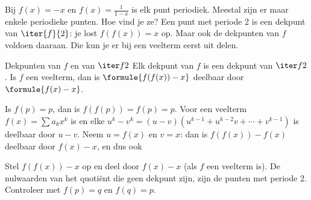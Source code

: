 Bij $f(x) = -x$ en $f(x) = \tfrac1{1-x}$ is elk punt periodiek. Meestal zijn er maar enkele periodieke punten. Hoe vind je ze? Een punt met periode 2 is een dekpunt van $\iter{f}{2}$: je lost $f(f(x)) = x$ op. Maar ook de dekpunten van $f$ voldoen daaraan. Die kun je er bij een veelterm eerst uit delen.

\begin{theorie}
\begin{stelling}{Dekpunten van $f$ en van $\iter f2$}
Elk dekpunt van $f$ is een dekpunt van $\iter f2$. Is $f$ een veelterm, dan is $\formule{f(f(x)) - x}$ deelbaar door $\formule{f(x) - x}$.
\end{stelling}

\begin{bewijs}
Is $f(p) = p$, dan is $f(f(p)) = f(p) = p$. Voor een veelterm $f(x) = \sum a_k x^k$ is
en elke $u^k - v^k = (u - v)(u^{k-1} + u^{k-2}v + \cdots + v^{k-1})$ is deelbaar door $u - v$. Neem $u = f(x)$ en $v = x$: dan is $f(f(x)) - f(x)$ deelbaar door $f(x) - x$, en dus ook
\end{bewijs}
\end{theorie}


\begin{werkwijze}
Stel $f(f(x)) - x$ op en deel door $f(x) - x$ (als $f$ een veelterm is). De nulwaarden van het quotiënt die geen dekpunt zijn, zijn de punten met periode 2. Controleer met $f(p) = q$ en $f(q) = p$.
\end{werkwijze}


